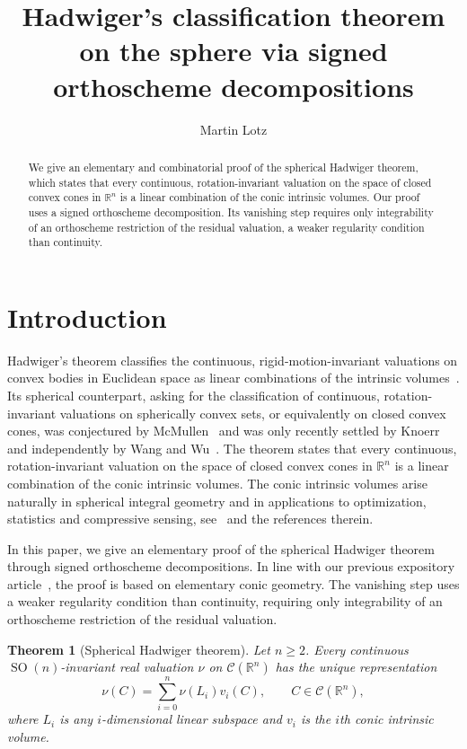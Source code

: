 \documentclass[11pt]{article}
\title{Hadwiger's classification theorem on the sphere via signed orthoscheme decompositions}
\author{Martin Lotz}
\affil{Mathematics Institute, University of Warwick}
\newcommand{\R}{\mathbb{R}}
\newcommand{\SOn}[1]{\operatorname{SO}(#1)}
\newcommand{\CC}{\mathcal{C}}
\newtheorem{theorem}{Theorem}[section]
\begin{document}
\maketitle

\begin{abstract}
We give an elementary and combinatorial proof of the spherical Hadwiger theorem, which states that every continuous, rotation-invariant valuation on the space of closed convex cones in $\R^n$ is a linear combination of the conic intrinsic volumes.
Our proof uses a signed orthoscheme decomposition. Its vanishing step requires only integrability of an orthoscheme restriction of the residual valuation, a weaker regularity condition than continuity.
\end{abstract}


\section{Introduction}
Hadwiger's theorem classifies the continuous, rigid-motion-invariant
valuations on convex bodies in Euclidean space as linear combinations of
the intrinsic volumes~\cite{Had57:Vorlesungen,klain:95}. Its spherical
counterpart, asking for the classification of continuous, rotation-invariant
valuations on spherically convex sets, or equivalently on closed convex
cones, was conjectured by McMullen~\cite[Problem~49]{Gruber1979} and was 
only recently settled by Knoerr~\cite[Theorem~A]{Knoerr:Spherical-Hadwiger} and
independently by Wang and Wu~\cite{WangWu:Spherical-Hadwiger}.
The theorem states that every continuous, rotation-invariant valuation on the space of closed convex cones in $\R^n$ is a linear combination of the conic intrinsic volumes.
The conic intrinsic volumes arise naturally in spherical integral
geometry and in applications to optimization, statistics and compressive
sensing, see~\cite{Sch22:Convex-Cones} and the references therein.

In this paper, we give an elementary proof of the spherical Hadwiger theorem
through signed orthoscheme decompositions. In line with our previous expository article~\cite{AmelunxenLotz:Intrinsic-Volumes-Cones},
the proof is based on elementary conic geometry. The vanishing step uses a weaker regularity condition
than continuity, requiring only integrability of an orthoscheme restriction of the residual valuation.

\begin{theorem}[Spherical Hadwiger theorem]\label{thm:main}
Let $n\ge2$. Every continuous $\SOn n$-invariant real valuation $\nu$ on
$\CC(\R^n)$ has the unique representation
\begin{equation}\label{eq:main-classification}
 \nu(C)=\sum_{i=0}^n\nu(L_i)v_i(C),\qquad C\in\CC(\R^n),
\end{equation}
where $L_i$ is any $i$-dimensional linear subspace and $v_i$ is the $i$th
conic intrinsic volume.
\end{theorem}
\end{document}
